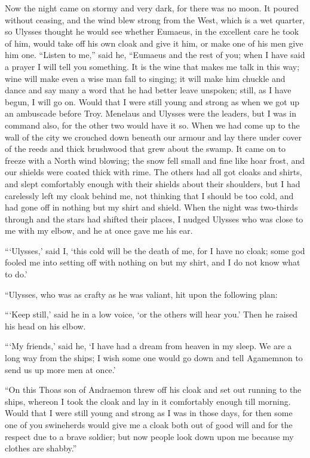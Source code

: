 Now the night came on stormy and very dark, for there was no moon. It poured
without ceasing, and the wind blew strong from the West, which is a wet
quarter, so Ulysses thought he would see whether Eumaeus, in the excellent care
he took of him, would take off his own cloak and give it him, or make one of
his men give him one. “Listen to me,” said he, “Eumaeus and the rest of you;
when I have said a prayer I will tell you something. It is the wine that makes
me talk in this way; wine will make even a wise man fall to singing; it will
make him chuckle and dance and say many a word that he had better leave
unspoken; still, as I have begun, I will go on. Would that I were still young
and strong as when we got up an ambuscade before Troy. Menelaus and Ulysses
were the leaders, but I was in command also, for the other two would have it
so. When we had come up to the wall of the city we crouched down beneath our
armour and lay there under cover of the reeds and thick brushwood that grew
about the swamp. It came on to freeze with a North wind blowing; the snow fell
small and fine like hoar frost, and our shields were coated thick with rime.
The others had all got cloaks and shirts, and slept comfortably enough with
their shields about their shoulders, but I had carelessly left my cloak behind
me, not thinking that I should be too cold, and had gone off in nothing but my
shirt and shield. When the night was two-thirds through and the stars had
shifted their places, I nudged Ulysses who was close to me with my elbow, and
he at once gave me his ear.

“‘Ulysses,’ said I, ‘this cold will be the death of me, for I have no cloak;
some god fooled me into setting off with nothing on but my shirt, and I do not
know what to do.’

“Ulysses, who was as crafty as he was valiant, hit upon the following plan:

“‘Keep still,’ said he in a low voice, ‘or the others will hear you.’ Then he
raised his head on his elbow.

“‘My friends,’ said he, ‘I have had a dream from heaven in my sleep. We are a
long way from the ships; I wish some one would go down and tell Agamemnon to
send us up more men at once.’

“On this Thoas son of Andraemon threw off his cloak and set out running to the
ships, whereon I took the cloak and lay in it comfortably enough till morning.
Would that I were still young and strong as I was in those days, for then some
one of you swineherds would give me a cloak both out of good will and for the
respect due to a brave soldier; but now people look down upon me because my
clothes are shabby.”

